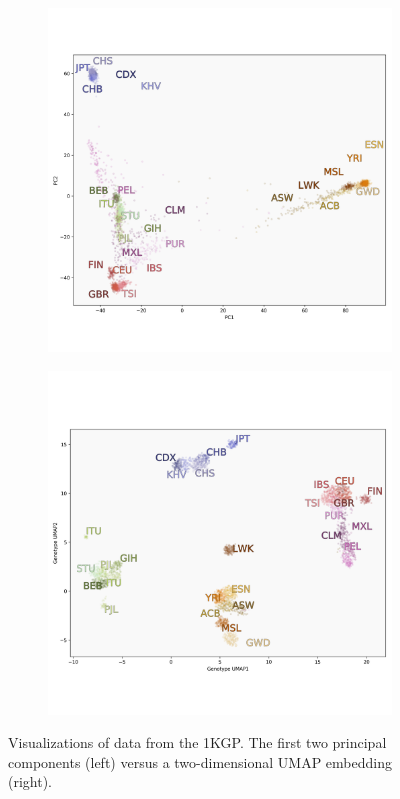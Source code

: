 \documentclass[12pt]{article}
\begin{document}
\begin{figure}[h!]
  \centering
  \begin{subfigure}[b]{0.45\linewidth}
    \includegraphics[width=\linewidth]{code/images/1KGP_PCA.png}
    \caption{}
    \label{fig:PCA}
  \end{subfigure}
  \begin{subfigure}[b]{0.45\linewidth}
    \includegraphics[width=\linewidth]{code/images/1KGP_genotype_UMAP.png}
    \caption{}
    \label{fig:UMAP}
  \end{subfigure}
  \caption{Visualizations of data from the 1KGP. The first two principal components (left) versus a two-dimensional UMAP embedding (right). }
  \label{fig:PCA_and_UMAP}
\end{figure}
\end{document}
